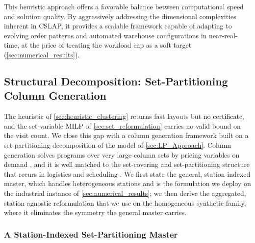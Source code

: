 \documentclass[preprint,review,11pt,authoryear]{elsarticle}
\begin{document}
\noindent This heuristic approach offers a favorable balance between computational speed and solution quality. By aggressively addressing the dimensional complexities inherent in CSLAP, it provides a scalable framework capable of adapting to evolving order patterns and automated warehouse configurations in near-real-time, at the price of treating the workload cap as a soft target (\cref{sec:numerical_results}).



\subsection{Structural Decomposition: Set-Partitioning Column Generation}\label{sec:cg}

The heuristic of \cref{sec:heuristic_clustering} returns fast layouts but no certificate, and the set-variable MILP of \cref{sec:set_reformulation} carries no valid bound on the visit count. We close this gap with a column generation framework built on a set-partitioning decomposition of the model of \cref{sec:LP_Approach}. Column generation solves programs over very large column sets by pricing variables on demand \cite{lubbecke2005selected}, and it is well matched to the set-covering and set-partitioning structure that recurs in logistics and scheduling \cite{desrochers1989column, muter2022}. We first state the general, station-indexed master, which handles heterogeneous stations and is the formulation we deploy on the industrial instance of \cref{sec:numerical_results}; we then derive the aggregated, station-agnostic reformulation that we use on the homogeneous synthetic family, where it eliminates the symmetry the general master carries.

\subsubsection{A Station-Indexed Set-Partitioning Master}\label{sec:cg_master_general}
\end{document}
